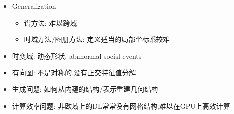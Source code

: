 \documentclass{article}
\begin{document}
\begin{itemize}
    \item Generalization
    \begin{itemize}
        \item 谱方法: 难以跨域
        \item 时域方法/图册方法: 定义适当的局部坐标系较难
    \end{itemize}
    \item 时变域: 动态形状, abnnormal social events
    \item 有向图: \lop 不是对称的,没有正交特征值分解
    \item 生成问题: 如何从内蕴的结构/表示重建几何结构
    \item 计算效率问题: 非欧域上的DL常常没有网格结构,难以在GPU上高效计算
\end{itemize}
\end{document}
